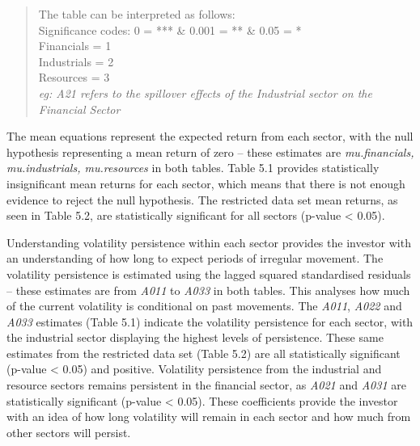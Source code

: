 \documentclass[11pt,preprint, authoryear]{elsarticle}
\numberwithin{equation}{section}
\numberwithin{figure}{section}
\numberwithin{table}{section}
\begin{document}
\begin{quote}
The table can be interpreted as follows:\\
Significance codes: 0 = *** \& 0.001 = ** \& 0.05 = *\\
Financials = 1\\
Industrials = 2\\
Resources = 3\\
\emph{eg: A21 refers to the spillover effects of the Industrial sector
on the Financial Sector}
\end{quote}

\newpage

The mean equations represent the expected return from each sector, with
the null hypothesis representing a mean return of zero -- these
estimates are \emph{mu.financials, mu.industrials, mu.resources} in both
tables. Table 5.1 provides statistically insignificant mean returns for
each sector, which means that there is not enough evidence to reject the
null hypothesis. The restricted data set mean returns, as seen in Table
5.2, are statistically significant for all sectors (p-value \textless{}
0.05).

Understanding volatility persistence within each sector provides the
investor with an understanding of how long to expect periods of
irregular movement. The volatility persistence is estimated using the
lagged squared standardised residuals -- these estimates are from
\emph{A011} to \emph{A033} in both tables. This analyses how much of the
current volatility is conditional on past movements. The \emph{A011},
\emph{A022} and \emph{A033} estimates (Table 5.1) indicate the
volatility persistence for each sector, with the industrial sector
displaying the highest levels of persistence. These same estimates from
the restricted data set (Table 5.2) are all statistically significant
(p-value \textless{} 0.05) and positive. Volatility persistence from the
industrial and resource sectors remains persistent in the financial
sector, as \emph{A021} and \emph{A031} are statistically significant
(p-value \textless{} 0.05). These coefficients provide the investor with
an idea of how long volatility will remain in each sector and how much
from other sectors will persist.
\end{document}
